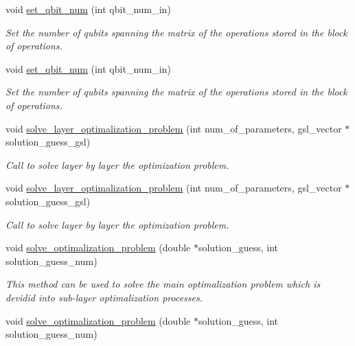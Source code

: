 \begin{DoxyCompactItemize}
void \hyperlink{class_operation__block_acc41ac933723558df3f4e65ae1158091}{set\+\_\+qbit\+\_\+num} (int qbit\+\_\+num\+\_\+in)
\begin{DoxyCompactList}\small\item\em Set the number of qubits spanning the matrix of the operations stored in the block of operations. \end{DoxyCompactList}\item 
void \hyperlink{class_operation__block_acc41ac933723558df3f4e65ae1158091}{set\+\_\+qbit\+\_\+num} (int qbit\+\_\+num\+\_\+in)
\begin{DoxyCompactList}\small\item\em Set the number of qubits spanning the matrix of the operations stored in the block of operations. \end{DoxyCompactList}\item 
void \hyperlink{class_sub___matrix___decomposition_ad2f34f8f0dbaced159b29ec882a3c4d2}{solve\+\_\+layer\+\_\+optimalization\+\_\+problem} (int num\+\_\+of\+\_\+parameters, gsl\+\_\+vector $\ast$solution\+\_\+guess\+\_\+gsl)
\begin{DoxyCompactList}\small\item\em Call to solve layer by layer the optimization problem. \end{DoxyCompactList}\item 
void \hyperlink{class_sub___matrix___decomposition_ad2f34f8f0dbaced159b29ec882a3c4d2}{solve\+\_\+layer\+\_\+optimalization\+\_\+problem} (int num\+\_\+of\+\_\+parameters, gsl\+\_\+vector $\ast$solution\+\_\+guess\+\_\+gsl)
\begin{DoxyCompactList}\small\item\em Call to solve layer by layer the optimization problem. \end{DoxyCompactList}\item 
void \hyperlink{class_decomposition___base_ae21ecd8c5016a6ec942330247e8cdebc}{solve\+\_\+optimalization\+\_\+problem} (double $\ast$solution\+\_\+guess, int solution\+\_\+guess\+\_\+num)
\begin{DoxyCompactList}\small\item\em This method can be used to solve the main optimalization problem which is devidid into sub-\/layer optimalization processes. \end{DoxyCompactList}\item 
void \hyperlink{class_decomposition___base_ae21ecd8c5016a6ec942330247e8cdebc}{solve\+\_\+optimalization\+\_\+problem} (double $\ast$solution\+\_\+guess, int solution\+\_\+guess\+\_\+num)

\end{DoxyCompactItemize}
